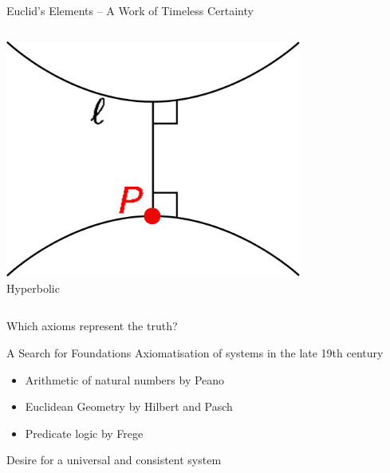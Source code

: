 \documentclass{beamer}
\begin{document}
\begin{frame}{Euclid's Elements -- A Work of Timeless Certainty}
{\begin{alertbox}
\begin{columns}[T,onlytextwidth]
\begin{column}{.33\textwidth}
		\centering\includegraphics[width=0.73\textwidth]{img/geo_hyp.png}\\Hyperbolic
	 \end{column}
	\end{columns}
	\end{alertbox}
	}
\end{frame}
\begin{frame}
	\centerline{\huge Which axioms represent the truth?}
\end{frame}
\begin{frame}{A Search for Foundations}
Axiomatisation of systems in the late 19th century
	\pause
	\begin{itemize}[<+->]
		\item Arithmetic of natural numbers by Peano
		\item Euclidean Geometry by Hilbert and Pasch
		\item Predicate logic by Frege
	\end{itemize}
	\pause[\thebeamerpauses]
	\centering \alert{Desire for a universal and consistent system}
\end{frame}
\end{document}
